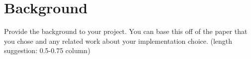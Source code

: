 \section{Background}
\label{sec:background}

Provide the background to your project. You can base this off of the paper that you chose and any related work about your implementation choice. (length suggestion: 0.5-0.75 column)

